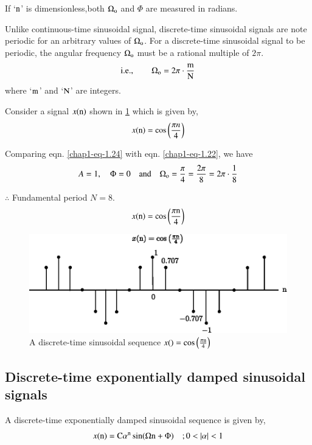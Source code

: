 If `$\textrm{n}$' is dimensionless,both $\Omega_{\textrm{o}}$ and $\Phi$ are measured in radians.

Unlike continuous-time sinusoidal signal, discrete-time sinusoidal signals are note periodic for an arbitrary values of $\Omega_{\textrm{o}}$. For a discrete-time sinusoidal signal to be periodic, the angular frequency $\Omega_{\textrm{o}}$ must be a rational multiple of $2 \pi$.
\begin{equation}
\text{i.e.}, \qquad \Omega_{\textrm{o}} = 2 \pi\cdot \dfrac{\textrm{m}}{\textrm{N}}\label{chap1-eq-1.23}
\end{equation}
where `$\textrm{m}$' and `$\textrm{N}$' are integers.

Consider a signal $x(\textrm{n})$ shown in \ref{chap1-fig-1.16} which is given by,
\begin{equation}
x(\textrm{n})= \cos\left(\dfrac{\pi n}{4}\right)\label{chap1-eq-1.24}
\end{equation}

Comparing eqn. \ref{chap1-eq-1.24} with eqn. \ref{chap1-eq-1.22}, we have
$$
A = 1, \quad \Phi = 0 \quad \text{and}\quad \Omega_{\textrm{o}} = \dfrac{\pi}{4} = \dfrac{2\pi}{ 8} = 2\pi\cdot \dfrac{1}{8} 
$$

$\therefore$ Fundamental period $N = 8$.
$$
x(\textrm{n})= \cos \left(\dfrac{\pi \textrm{n}}{4} \right)
$$
\begin{figure}[H]
\centering
\includegraphics{src/chap1/fig.1.16.eps}
\caption{A discrete-time sinusoidal sequence $x(\rm)= \cos\left(\frac{\pi \textrm{n}}{4}\right)$}\label{chap1-fig-1.16}
\end{figure}


\subsection{Discrete-time exponentially damped sinusoidal signals}\label{chap1-subsec-1.4.3}

A discrete-time exponentially damped sinusoidal sequence  is given by,
\begin{equation}
x(\textrm{n}) = \textrm{C} \alpha^{\textrm{n}} \sin(\Omega \textrm{n} + \Phi) \quad ; 0 < |\alpha| < 1 \label{chap1-eq-1.25}
\end{equation}

